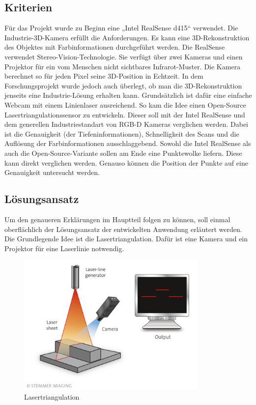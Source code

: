 	\subsection{Kriterien}
	Für das Projekt wurde zu Beginn eine „Intel RealSense d415“ verwendet. Die Industrie-3D-Kamera erfüllt die Anforderungen. Es kann eine 3D-Rekonstruktion des Objektes mit Farbinformationen durchgeführt werden. Die RealSense verwendet Stereo-Vision-Technologie. Sie verfügt über zwei Kameras und einen Projektor für ein vom Menschen nicht sichtbares Infrarot-Muster. Die Kamera berechnet so für jeden Pixel seine 3D-Position in Echtzeit. In dem Forschungsprojekt wurde jedoch auch überlegt, ob man die 3D-Rekonstruktion jenseits eine Industrie-Lösung erhalten kann. Grundsätzlich ist dafür eine einfache Webcam mit einem Linienlaser ausreichend. So kam die Idee einen Open-Source Lasertriangulationssensor zu entwickeln.
	Dieser soll mit der Intel RealSense und dem generellen Industriestandart von RGB-D Kameras verglichen werden. Dabei ist die Genauigkeit (der Tiefeninformationen), Schnelligkeit des Scans und die Auflösung der Farbinformationen ausschlaggebend. Sowohl die Intel RealSense als auch die Open-Source-Variante sollen am Ende eine Punktewolke liefern. Diese kann direkt verglichen werden. Genauso können die Position der Punkte auf eine Genauigkeit untersucht werden. 
	
	\subsection{Lösungsansatz}
	Um den genaueren Erklärungen im Hauptteil folgen zu können, soll einmal oberflächlich der Lösungsansatz der entwickelten Anwendung erläutert werden. Die Grundlegende Idee ist die Lasertriangulation. Dafür ist eine Kamera und ein Projektor für eine Laserlinie notwendig.
	
	\begin{figure}[h]
		\centering
		\includegraphics[height=7cm]{img/grundlagen/lasertriangulation_1}
		\caption{Lasertriangulation}
		\label{fig:lasertriangulation}
	\end{figure}
	
